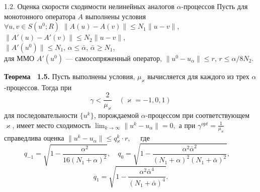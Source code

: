 \documentclass[10pt,pdf, mathserif, hyperref={unicode}]{beamer}
\begin{document}
\begin{frame}{\small 1.2. Оценка скорости сходимости нелинейных аналогов $\alpha$-процессов}
		Пусть для монотонного оператора $A$ выполнены условия \\ $\forall u, v \in S(u^0;R)$ $\|A(u)-A(v)\|\leqslant N_1\|u-v\|$, $\|A'(u)-A'(v)\|\leqslant N_2\|u-v\|$,	\\ $\|A'(u^0)\| \leqslant N_1$, $\alpha \leqslant \bar\alpha$, $\bar\alpha \geqslant N_1$, \\для ММО $A'(u^0)$ --- самосопряженный оператор, $\|u^0-u_\alpha\| \leqslant r$, $r\leqslant \alpha/8N_2.$
	\begin{block}{\bf Теорема ~1.5.}
		Пусть выполнены условия, $\mu _\varkappa$ вычисляется для каждого из трех $\alpha$-процессов. Тогда при
		$$\gamma <\frac{2}{\mu _\varkappa}\quad (\varkappa=-1,0,1)$$
		для последовательности $\{u^k\}$, порождаемой $\alpha$-процессом при соответствующем $\varkappa$, имеет место сходимость $\lim_{k\to\infty}\|u^k-u_\alpha\|=0, $ а при 
		$\gamma^{opt}=\frac{1}{\mu_\varkappa}$
		справедлива оценка $\|u^k-u_\alpha\|\leqslant q{_\varkappa^k}\cdot r,$ \ \ где
		$$
		q_{-1}=\sqrt{1-\frac{\alpha^2}{16(N_1+\alpha)^2}}, \quad q_0=\sqrt{1-\frac{\alpha^2\bar\alpha^2}{(N_1+\alpha)^2(N_1+\bar\alpha)^2}}, \quad $$$$q_1=\sqrt{1-\frac{\alpha^2\bar\alpha^4}{(N_1+\bar\alpha)^4}}.
		$$
	\end{block}
\end{frame}
\end{document}
